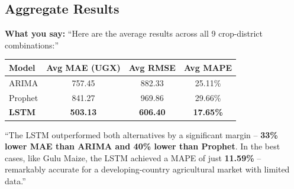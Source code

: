 \documentclass[11pt,a4paper]{article}
\begin{document}
\subsection{Aggregate Results}
\textbf{What you say:}
``Here are the average results across all 9 crop-district combinations:''

\begin{center}
\begin{tabular}{lccc}
\toprule
\textbf{Model} & \textbf{Avg MAE (UGX)} & \textbf{Avg RMSE} & \textbf{Avg MAPE} \\
\midrule
ARIMA & 757.45 & 882.33 & 25.11\% \\
Prophet & 841.27 & 969.86 & 29.66\% \\
\textbf{LSTM} & \textbf{503.13} & \textbf{606.40} & \textbf{17.65\%} \\
\bottomrule
\end{tabular}
\end{center}

``The LSTM outperformed both alternatives by a significant margin -- \textbf{33\% lower MAE than ARIMA and 40\% lower than Prophet}. In the best cases, like Gulu Maize, the LSTM achieved a MAPE of just \textbf{11.59\%} -- remarkably accurate for a developing-country agricultural market with limited data.''
\end{document}

